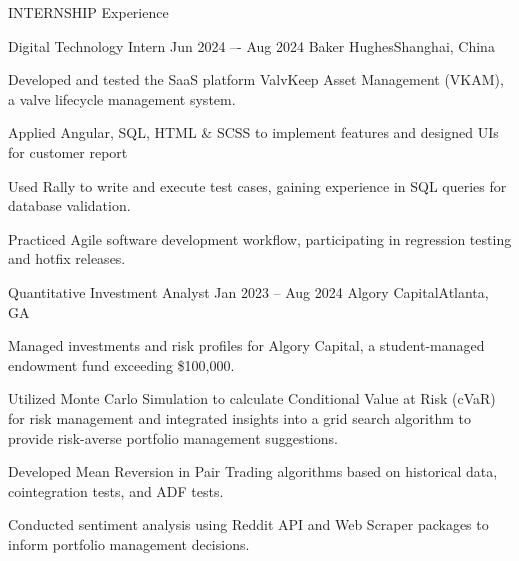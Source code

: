 \documentclass[10pt, letterpaper]{resume} %
\begin{document}
\begin{rSection}{INTERNSHIP Experience} \itemsep -3pt  

\begin{rSubsection}
	{Digital Technology Intern}
	{Jun 2024 –- Aug 2024}
	{Baker Hughes\hfill{Shanghai, China}}
	
	\item Developed and tested the SaaS platform ValvKeep Asset Management (VKAM), a valve lifecycle management system. 
	\item Applied Angular, SQL, HTML \& SCSS to implement features and designed UIs for customer report
	\item Used Rally to write and execute test cases, gaining experience in SQL queries for database validation. 
	\item Practiced Agile software development workflow, participating in regression testing and hotfix releases. 
\end{rSubsection}

\begin{rSubsection}
	{Quantitative Investment Analyst	}
	{Jan 2023 -- Aug 2024}
	{Algory Capital\hfill{Atlanta, GA}}
	
	\item Managed investments and risk profiles for Algory Capital, a student-managed endowment fund exceeding \$100,000.
	\item Utilized Monte Carlo Simulation to calculate Conditional Value at Risk (cVaR) for risk management and integrated insights into a grid search algorithm to provide risk-averse portfolio management suggestions.
	\item Developed Mean Reversion in Pair Trading algorithms based on historical data, cointegration tests, and ADF tests. 
	\item Conducted sentiment analysis using Reddit API and Web Scraper packages to inform portfolio management decisions.
\end{rSubsection}
 
\end{rSection} 

  
%
%
%
  

\end{document}
